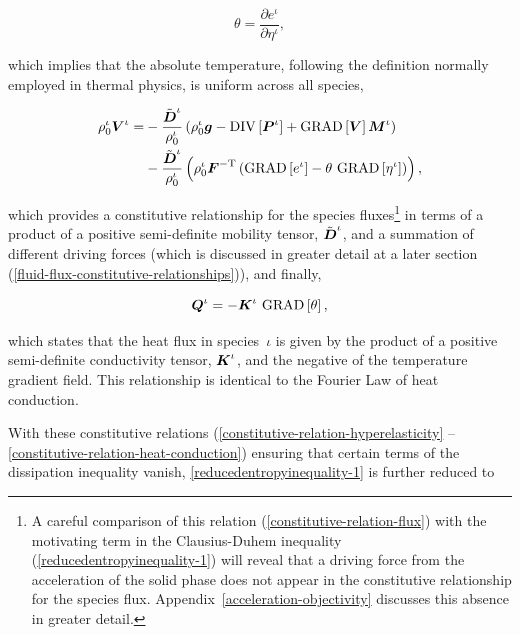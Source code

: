 \begin{equation}
\theta = \frac{\partial e^\iota}{\partial \eta^\iota},
\label{constitutive-relation-temperature}
\end{equation}

\noindent which implies that the absolute temperature, following the
definition normally employed in thermal physics, is uniform across all
species,

\begin{equation}
\begin{split}
\rho^\iota_0\mbox{\boldmath$ V$}^\iota  = & -\frac{\tilde{\mbox{\boldmath$ D$}}^\iota}{\rho^\iota_0} \left(
 \rho_0^\iota\mbox{\boldmath$ g$} - \mathrm{DIV}\left[\mbox{\boldmath$ P$}^\iota\right] +
\mathrm{GRAD}\left[\mbox{\boldmath$ V$}\right]\mbox{\boldmath$ M$}^\iota\right)\\
& -\frac{\tilde{\mbox{\boldmath$ D$}}^\iota}{\rho^\iota_0}\left(\rho^\iota_0
\mbox{\boldmath$ F$}^{-\mathrm{T}}\left( \mathrm{GRAD}\left[ e^\iota\right]
  - \theta\ \mathrm{GRAD}\left[\eta^\iota\right]\right)\right),
\label{constitutive-relation-flux}
\end{split}
\end{equation}

\noindent which provides a constitutive relationship for the species
fluxes\footnote{A careful comparison of this relation
  (\ref{constitutive-relation-flux}) with the motivating term in the
  Clausius-Duhem inequality (\ref{reducedentropyinequality-1}) will
  reveal that a driving force from the acceleration of the solid phase
  does not appear in the constitutive relationship for the species
  flux. Appendix~\ref{acceleration-objectivity} discusses this absence
  in greater detail.} in terms of a product of a positive
semi-definite mobility tensor, ${\tilde{\mbox{\boldmath$ D$}}}^\iota$, and a summation
of different driving forces (which is discussed in greater detail at a
later section (\ref{fluid-flux-constitutive-relationships})), and
finally,

\begin{equation}
\bQ^\iota = -{\bK}^\iota\ \mathrm{GRAD}\left[\theta\right],
\label{constitutive-relation-heat-conduction}
\end{equation}

\noindent which states that the heat flux in species~$\iota$ is given
by the product of a positive semi-definite conductivity tensor,
${\mbox{\boldmath$ K$}}^\iota$, and the negative of the temperature gradient
field. This relationship is identical to the Fourier Law of heat
conduction.

With these constitutive relations
(\ref{constitutive-relation-hyperelasticity}%
--\ref{constitutive-relation-heat-conduction}) ensuring that certain
terms of the dissipation inequality vanish,
\ref{reducedentropyinequality-1} is further reduced to


